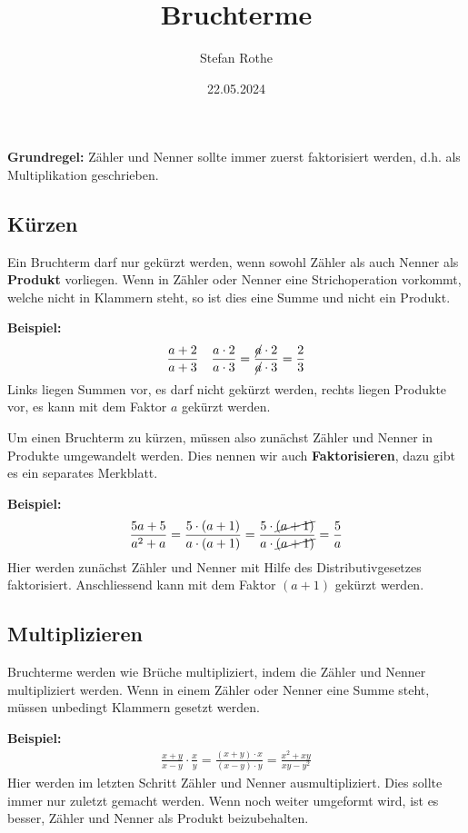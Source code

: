\documentclass[parskip=half]{scrartcl}
\title{Bruchterme}
\author{Stefan Rothe}
\date{22.05.2024}
\begin{document}
  \maketitle

  \begin{note}
    \textbf{Grundregel:} Zähler und Nenner sollte immer zuerst faktorisiert werden, d.h. als Multiplikation geschrieben.
  \end{note}

  \subsection*{Kürzen}
  Ein Bruchterm darf nur gekürzt werden, wenn sowohl Zähler als auch Nenner als \textbf{Produkt} vorliegen. Wenn in Zähler oder Nenner eine Strichoperation vorkommt, welche nicht in Klammern steht, so ist dies eine Summe und nicht ein Produkt.
  \begin{example}
    \textbf{Beispiel:}
    \begin{align*}
      \frac{a+2}{a+3} && \frac{a\cdot 2}{a\cdot 3} = \frac{\cancel{a}\cdot 2}{\cancel{a}\cdot 3}= \frac{2}{3}
    \end{align*}
    Links liegen Summen vor, es darf nicht gekürzt werden, rechts liegen Produkte vor, es kann mit dem Faktor $a$ gekürzt werden.
  \end{example}

  Um einen Bruchterm zu kürzen, müssen also zunächst Zähler und Nenner in Produkte umgewandelt werden. Dies nennen wir auch \textbf{Faktorisieren}, dazu gibt es ein separates Merkblatt.

  \begin{example}
    \textbf{Beispiel:}
    \begin{align*}
      \frac{5a+5}{a^{2}+a} = \frac{5\cdot (a+1)}{a\cdot (a+1)} = \frac{5\cdot \cancel{(a+1)}}{a\cdot \cancel{(a+1)}} = \frac{5}{a}
    \end{align*}
    Hier werden zunächst Zähler und Nenner mit Hilfe des Distributivgesetzes faktorisiert. Anschliessend kann mit dem Faktor $(a+1)$ gekürzt werden.
  \end{example}

  \subsection*{Multiplizieren}
  Bruchterme werden wie Brüche multipliziert, indem die Zähler und Nenner multipliziert werden. Wenn in einem Zähler oder Nenner eine Summe steht, müssen unbedingt Klammern gesetzt werden.
  \begin{example}
    \textbf{Beispiel:}
    \begin{align*}
      \frac{x+y}{x-y}\cdot \frac{x}{y} = \frac{(x+y)\cdot x}{(x-y)\cdot y} = \frac{x^{2}+xy}{xy-y^{2}}
    \end{align*}
    Hier werden im letzten Schritt Zähler und Nenner ausmultipliziert. Dies sollte immer nur zuletzt gemacht werden. Wenn noch weiter umgeformt wird, ist es besser, Zähler und Nenner als Produkt beizubehalten.
  \end{example}
\end{document}

